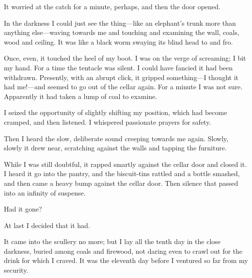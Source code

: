 It worried at the catch for a minute, perhaps, and then the door opened.

In the darkness I could just see the thing—like an elephant's trunk more than anything else—waving towards me and touching and examining the wall, coals, wood and ceiling. It was like a black worm swaying its blind head to and fro.

Once, even, it touched the heel of my boot. I was on the verge of screaming; I bit my hand. For a time the tentacle was silent. I could have fancied it had been withdrawn. Presently, with an abrupt click, it gripped something—I thought it had me!—and seemed to go out of the cellar again. For a minute I was not sure. Apparently it had taken a lump of coal to examine.

I seized the opportunity of slightly shifting my position, which had become cramped, and then listened. I whispered passionate prayers for safety.

Then I heard the slow, deliberate sound creeping towards me again. Slowly, slowly it drew near, scratching against the walls and tapping the furniture.

While I was still doubtful, it rapped smartly against the cellar door and closed it. I heard it go into the pantry, and the biscuit-tins rattled and a bottle smashed, and then came a heavy bump against the cellar door. Then silence that passed into an infinity of suspense.

Had it gone?

At last I decided that it had.

It came into the scullery no more; but I lay all the tenth day in the close darkness, buried among coals and firewood, not daring even to crawl out for the drink for which I craved. It was the eleventh day before I ventured so far from my security.

